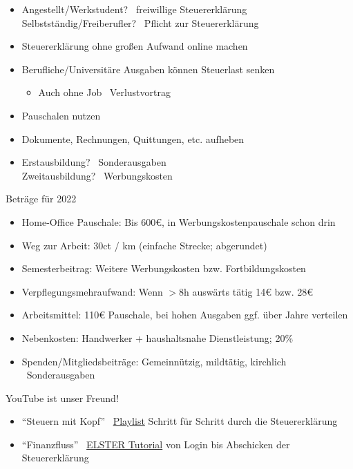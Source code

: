 \documentclass{beamer}
\begin{document}
			\begin{frame}
				\begin{itemize}
					\item Angestellt/Werkstudent? \textrightarrow\ freiwillige Steuererklärung\\
					Selbstständig/Freiberufler? \textrightarrow\ Pflicht zur Steuererklärung\pause
					\item Steuererklärung ohne großen Aufwand online machen\pause
					\item Berufliche/Universitäre Ausgaben können Steuerlast senken
					\begin{itemize}
						\item Auch ohne Job \textrightarrow\ Verlustvortrag
					\end{itemize}
					\item Pauschalen nutzen
					\item Dokumente, Rechnungen, Quittungen, etc. aufheben\pause
					\item Erstausbildung? \textrightarrow\ Sonderausgaben\\
					Zweitausbildung? \textrightarrow\ Werbungskosten\vspace{-0.1cm}
				\end{itemize}
			\end{frame}
		
			\begin{frame}{}
				\begingroup\tiny Beträge für 2022\endgroup
				\begin{itemize}
					\item Home-Office Pauschale: Bis 600€, in Werbungskostenpauschale schon drin
					\item Weg zur Arbeit: 30ct / km (einfache Strecke; abgerundet)
					\item Semesterbeitrag: Weitere Werbungskosten bzw. Fortbildungskosten
					\item Verpflegungsmehraufwand: Wenn $>$8h auswärts tätig 14€ bzw. 28€
					\item Arbeitsmittel: 110€ Pauschale, bei hohen Ausgaben ggf. über Jahre verteilen
					\item Nebenkosten: Handwerker + haushaltsnahe Dienstleistung; 20\%
					\item Spenden/Mitgliedsbeiträge: Gemeinnützig, mildtätig, kirchlich \textrightarrow\ Sonderausgaben
				\end{itemize}
			\end{frame}
		
			\begin{frame}
				YouTube ist unser Freund!\n
				\begin{itemize}
					\item "`Steuern mit Kopf"' \textrightarrow\ \href{https://www.youtube.com/watch?v=vEYL7AlCTgw&list=PL0OXhlRkvak8sq4efIvHYxx4e_DrE8zZT}{Playlist} Schritt für Schritt durch die Steuererklärung
					\item "`Finanzfluss"' \textrightarrow\ \href{https://www.youtube.com/watch?v=FiAGN-RrHMg}{ELSTER Tutorial} von Login bis Abschicken der Steuererklärung
				\end{itemize}
			\end{frame}
	
\end{document}
